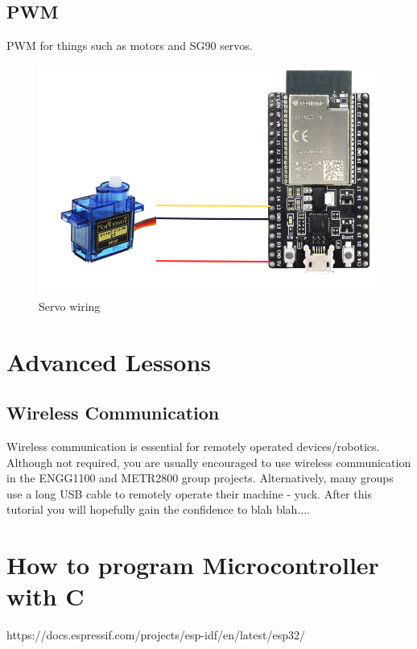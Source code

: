 \documentclass[11pt]{article}
\begin{document}
\subsection*{PWM}
PWM for things such as motors and SG90 servos.
\begin{figure}[H]
  \centering
  \includegraphics[scale = 0.3]{servo.png}
  \caption{Servo wiring}
  \label{fig:servo}
\end{figure}
\section*{Advanced Lessons}
\subsection*{Wireless Communication}
Wireless communication is essential for remotely operated devices/robotics. 
Although not required, you are usually encouraged to use wireless 
communication in the ENGG1100 and METR2800 group projects.
Alternatively, many groups use a long USB cable to remotely operate their 
machine - yuck. After this tutorial you will hopefully gain the confidence to blah blah....

\section*{How to program Microcontroller with C}
https://docs.espressif.com/projects/esp-idf/en/latest/esp32/
\end{document}

